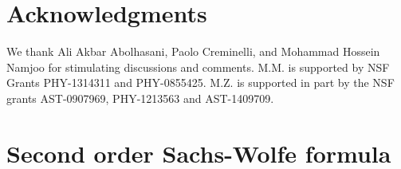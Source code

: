 \documentclass[12pt]{article}
\numberwithin{equation}{section}
\begin{document}
{%
\section*{Acknowledgments}

We thank Ali Akbar Abolhasani, Paolo Creminelli, and Mohammad Hossein Namjoo for stimulating discussions and comments. M.M. is supported by NSF Grants PHY-1314311 and PHY-0855425. M.Z. is supported in part by the NSF grants AST-0907969, PHY-1213563 and AST-1409709.
\appendix

\section{Second order Sachs-Wolfe formula\label{appSW}}

}
\end{document}
